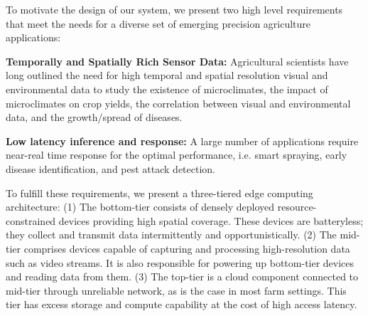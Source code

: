 
To motivate the design of our system, we present two high level requirements that meet the needs for a diverse set of emerging precision agriculture applications: 

\noindent\textbf{Temporally and Spatially Rich Sensor Data:} Agricultural scientists have long outlined the need for high temporal and spatial resolution visual and environmental data to study the existence of microclimates, the impact of microclimates on crop yields, the correlation between visual and environmental data, and the growth/spread of diseases\cite{microclimate-specifics, microcolimate-effect, microclimates}. 
    
\noindent\textbf{Low latency inference and response:} A large number of applications require near-real time response for the optimal performance, i.e. smart spraying, early disease identification, and pest attack detection. 

To fulfill these requirements, we present a three-tiered edge computing architecture: (1) The bottom-tier consists of densely deployed resource-constrained devices providing high spatial coverage. These devices are batteryless; they collect and transmit data intermittently and opportunistically. (2) The mid-tier comprises devices capable of capturing and processing high-resolution data such as video streams. It is also responsible for powering up bottom-tier devices and reading data from them. (3) The top-tier is a cloud component connected to mid-tier through unreliable network, as is the case in most farm settings. This tier has excess storage and compute capability at the cost of high access latency.

